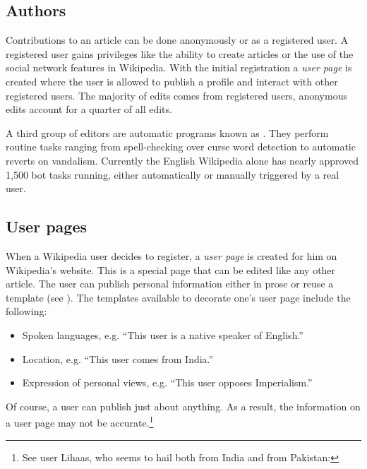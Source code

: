\subsection{Authors}\label{sub:authors}

Contributions to an article can be done anonymously or as a registered user.
A registered user gains privileges like the ability to create articles or the use of the social network features in Wikipedia.
With the initial registration a \emph{user page} is created where the user is allowed to publish a profile and interact with other registered users.\cite{wikiwhyaccount}
The majority of edits comes from registered users, anonymous edits account for a quarter of all edits.\cite{wpanonstats}

A third group of editors are automatic programs known as .
They perform routine tasks ranging from spell-checking over curse word detection to automatic reverts on vandalism.
Currently the English Wikipedia alone has nearly approved 1,500 bot tasks running, either automatically or manually triggered by a real user.\cite{wpbots}

\subsection{User pages}\label{sub:userpages}

When a Wikipedia user decides to register, a \emph{user page} is created for him on Wikipedia's website. 
This is a special page that can be edited like any other article.
The user can publish personal information either in prose or reuse a template (see ).
The templates available to decorate one's user page include the following: 
\begin{itemize}
  \item Spoken languages, e.g. ``This user is a native speaker of English.''
  \item Location, e.g. ``This user comes from India.''
  \item Expression of personal views, e.g. ``This user opposes Imperialism.''
\end{itemize}
Of course, a user can publish just about anything.
As a result, the information on a user page may not be accurate.\footnote{See user Lihaas, who seems to hail both from India and from Pakistan: }


